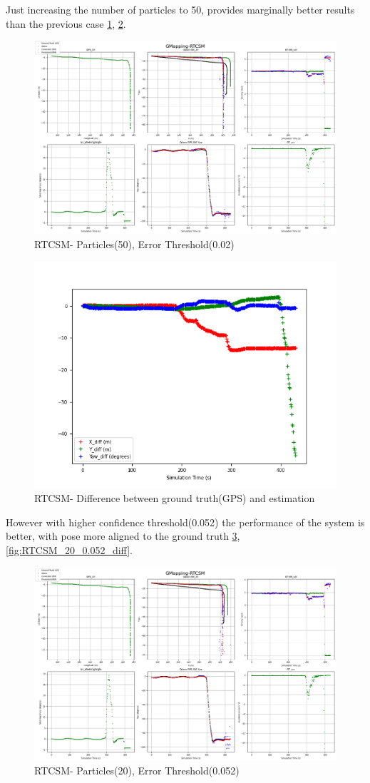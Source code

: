\clearpage
Just increasing the number of particles to 50, provides marginally better results than the previous case \ref{fig:RTCSM_50_0.05}, \ref{fig:RTCSM_50_0.05_diff}.
    \begin{figure}[h] 
        \includegraphics[height=0.6\textwidth]{images/GMapping-RTCSM_Map_50_0.05.png}
        \caption{RTCSM- Particles(50), Error Threshold(0.02)}
        \label{fig:RTCSM_50_0.05}
    \end{figure}
    \begin{figure}[h] 
        \includegraphics[height=0.4\textwidth]{images/GMapping-RTCSM_True_vs_Crct_50_0.05.png}
        \caption{RTCSM- Difference between ground truth(GPS) and estimation}
        \label{fig:RTCSM_50_0.05_diff}
    \end{figure}
\clearpage
However with higher confidence threshold(0.052) the performance of the system is better, with pose more aligned to the ground truth \ref{fig:RTCSM_20_0.052}, \ref{fig:RTCSM_20_0.052_diff}.
    \begin{figure}[h] 
        \includegraphics[height=0.6\textwidth]{images/GMapping-RTCSM_Map_20_0.052.png}
        \caption{RTCSM- Particles(20), Error Threshold(0.052)}
        \label{fig:RTCSM_20_0.052}
    \end{figure}
